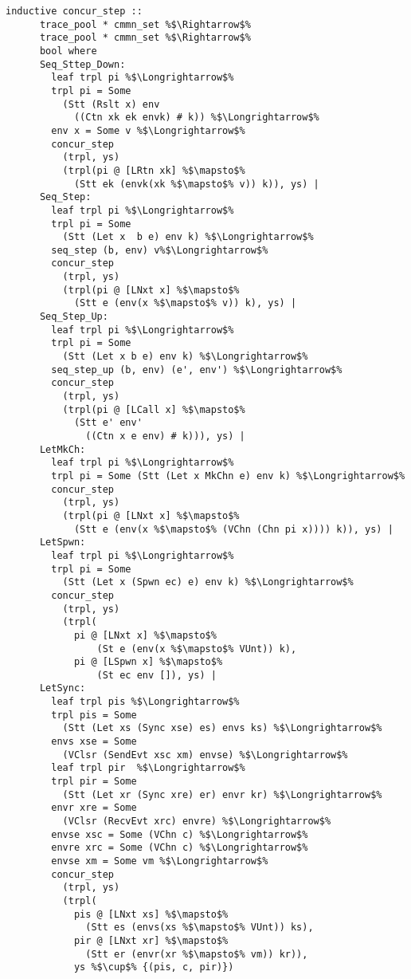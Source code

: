 \documentclass{article}
\begin{document}
\begin{lstlisting}[style=codestyle1, escapechar=\%]
    inductive concur_step ::
      trace_pool * cmmn_set %$\Rightarrow$%
      trace_pool * cmmn_set %$\Rightarrow$%
      bool where 
      Seq_Sttep_Down:
        leaf trpl pi %$\Longrightarrow$%
        trpl pi = Some
          (Stt (Rslt x) env
            ((Ctn xk ek envk) # k)) %$\Longrightarrow$%
        env x = Some v %$\Longrightarrow$%
        concur_step
          (trpl, ys)
          (trpl(pi @ [LRtn xk] %$\mapsto$%
            (Stt ek (envk(xk %$\mapsto$% v)) k)), ys) |
      Seq_Step:
        leaf trpl pi %$\Longrightarrow$%
        trpl pi = Some
          (Stt (Let x  b e) env k) %$\Longrightarrow$%
        seq_step (b, env) v%$\Longrightarrow$%
        concur_step
          (trpl, ys)
          (trpl(pi @ [LNxt x] %$\mapsto$%
            (Stt e (env(x %$\mapsto$% v)) k), ys) |
      Seq_Step_Up: 
        leaf trpl pi %$\Longrightarrow$%
        trpl pi = Some
          (Stt (Let x b e) env k) %$\Longrightarrow$%
        seq_step_up (b, env) (e', env') %$\Longrightarrow$%
        concur_step
          (trpl, ys)
          (trpl(pi @ [LCall x] %$\mapsto$%
            (Stt e' env'
              ((Ctn x e env) # k))), ys) |
      LetMkCh: 
        leaf trpl pi %$\Longrightarrow$%
        trpl pi = Some (Stt (Let x MkChn e) env k) %$\Longrightarrow$%
        concur_step
          (trpl, ys)
          (trpl(pi @ [LNxt x] %$\mapsto$%
            (Stt e (env(x %$\mapsto$% (VChn (Chn pi x)))) k)), ys) |
      LetSpwn:
        leaf trpl pi %$\Longrightarrow$%
        trpl pi = Some
          (Stt (Let x (Spwn ec) e) env k) %$\Longrightarrow$%
        concur_step
          (trpl, ys)
          (trpl(
            pi @ [LNxt x] %$\mapsto$%
                (St e (env(x %$\mapsto$% VUnt)) k), 
            pi @ [LSpwn x] %$\mapsto$%
                (St ec env []), ys) |
      LetSync:
        leaf trpl pis %$\Longrightarrow$%
        trpl pis = Some
          (Stt (Let xs (Sync xse) es) envs ks) %$\Longrightarrow$%
        envs xse = Some
          (VClsr (SendEvt xsc xm) envse) %$\Longrightarrow$%
        leaf trpl pir  %$\Longrightarrow$%
        trpl pir = Some
          (Stt (Let xr (Sync xre) er) envr kr) %$\Longrightarrow$%
        envr xre = Some
          (VClsr (RecvEvt xrc) envre) %$\Longrightarrow$%
        envse xsc = Some (VChn c) %$\Longrightarrow$%
        envre xrc = Some (VChn c) %$\Longrightarrow$%
        envse xm = Some vm %$\Longrightarrow$%
        concur_step
          (trpl, ys)
          (trpl(
            pis @ [LNxt xs] %$\mapsto$%
              (Stt es (envs(xs %$\mapsto$% VUnt)) ks), 
            pir @ [LNxt xr] %$\mapsto$%
              (Stt er (envr(xr %$\mapsto$% vm)) kr)), 
            ys %$\cup$% {(pis, c, pir)})

    \end{lstlisting}
\end{document}
